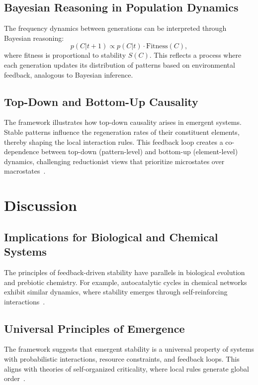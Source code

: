 \documentclass[entropy,article,submit,pdftex,moreauthors]{Definitions/mdpi}
\begin{document}
\subsection{Bayesian Reasoning in Population Dynamics}

The frequency dynamics between generations can be interpreted through Bayesian reasoning:
\begin{equation}
p(C|t+1) \propto p(C|t) \cdot \text{Fitness}(C),
\end{equation}
where fitness is proportional to stability \( S(C) \). This reflects a process where each generation updates its distribution of patterns based on environmental feedback, analogous to Bayesian inference.

\subsection{Top-Down and Bottom-Up Causality}

The framework illustrates how top-down causality arises in emergent systems. Stable patterns influence the regeneration rates of their constituent elements, thereby shaping the local interaction rules. This feedback loop creates a co-dependence between top-down (pattern-level) and bottom-up (element-level) dynamics, challenging reductionist views that prioritize microstates over macrostates~\cite{laughlin2000different}.

\section{Discussion}

\subsection{Implications for Biological and Chemical Systems}

The principles of feedback-driven stability have parallels in biological evolution and prebiotic chemistry. For example, autocatalytic cycles in chemical networks exhibit similar dynamics, where stability emerges through self-reinforcing interactions~\cite{kauffman1993origins}.

\subsection{Universal Principles of Emergence}

The framework suggests that emergent stability is a universal property of systems with probabilistic interactions, resource constraints, and feedback loops. This aligns with theories of self-organized criticality, where local rules generate global order~\cite{bak1996how}.
\end{document}

